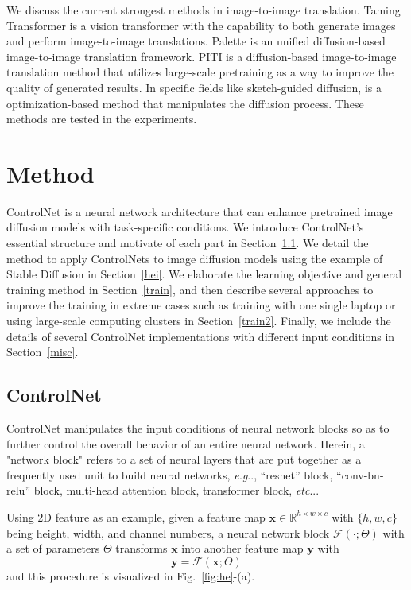 \documentclass{article}
\makeatletter
\DeclareRobustCommand\onedot{\futurelet\@let@token\@onedot}
\def\@onedot{\ifx\@let@token.\else.\null\fi\xspace}
\def\eg{\emph{e.g}\onedot}
\def\etc{\emph{etc}\onedot}
\makeatother
\begin{document}
We discuss the current strongest methods in image-to-image translation. 
Taming Transformer \cite{DBLP:journals/corr/abs-2012-09841} is a vision transformer with the capability to both generate images and perform image-to-image translations.
Palette \cite{10.1145/3528233.3530757} is an unified diffusion-based image-to-image translation framework. 
PITI \cite{2205.12952} is a diffusion-based image-to-image translation method that utilizes large-scale pretraining as a way to improve the quality of generated results.
In specific fields like sketch-guided diffusion, \cite{voynov2022sketch} is a optimization-based method that manipulates the diffusion process.
These methods are tested in the experiments. 

\section{Method}

ControlNet is a neural network architecture that can enhance pretrained image diffusion models with task-specific conditions.
We introduce ControlNet's essential structure and motivate of each part in Section~\ref{he}.
We detail the method to apply ControlNets to image diffusion models using the example of Stable Diffusion in Section~\ref{hei}.
We elaborate the learning objective and general training method in Section~\ref{train}, and then describe several approaches to improve the training in extreme cases such as training with one single laptop or using large-scale computing clusters in Section~\ref{train2}.
Finally, we include the details of several ControlNet implementations with different input conditions in Section~\ref{misc}.

\subsection{ControlNet}
\label{he}

ControlNet manipulates the input conditions of neural network blocks so as to further control the overall behavior of an entire neural network. Herein, a "network block" refers to a set of neural layers that are put together as a frequently used unit to build neural networks, \eg, ``resnet'' block, ``conv-bn-relu'' block, multi-head attention block, transformer block, \etc.

Using 2D feature as an example, given a feature map $\bm{x}\in\mathbb{R}^{h\times w \times c}$ with $\{h, w, c\}$ being height, width, and channel numbers, a neural network block $\mathcal{F}(\cdot;\Theta)$ with a set of parameters $\Theta$ transforms $\bm{x}$ into another feature map $\bm{y}$ with 
\begin{equation}
	\bm{y}=\mathcal{F}(\bm{x};\Theta)
\end{equation}
and this procedure is visualized in Fig.~\ref{fig:he}-(a).
\end{document}
